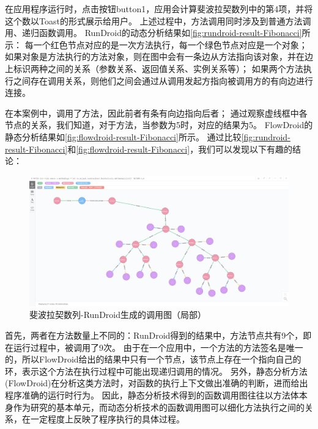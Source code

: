 在应用程序运行时，点击按钮button1，应用会计算斐波拉契数列中的第4项，并将这个数以Toast的形式展示给用户。
上述过程中，方法调用同时涉及到普通方法调用、递归函数调用。
RunDroid的动态分析结果如\autoref{fig:rundroid-result-Fibonacci}所示：
每一个红色节点对应的是一次方法执行，每一个绿色节点对应是一个对象；
如果对象是方法执行的方法对象，则在图中会有一条边从方法指向该对象，并在边上标识两种之间的关系（参数关系、返回值关系、实例关系等）；
如果两个方法执行之间存在调用关系，则他们之间会通过从调用发起方指向被调用方的有向边进行连接。

在本案例中，调用了方法，因此前者有条有向边指向后者；
通过观察虚线框中各节点的关系，我们知道，对于方法，当参数为5时，对应的结果为5。
FlowDroid的静态分析结果如\autoref{fig:flowdroid-result-Fibonacci}所示。
通过比较\autoref{fig:rundroid-result-Fibonacci}和\autoref{fig:flowdroid-result-Fibonacci}，我们可以发现以下有趣的结论：


\begin{figure}[!ht]
	\centering
	\includegraphics[width=\textwidth]{./Figures/doFibonacci-rundroid.png}
	\caption{斐波拉契数列-RunDroid生成的调用图（局部）}
	\label{fig:rundroid-result-Fibonacci}
\end{figure}

首先，两者在方法数量上不同的：RunDroid得到的结果中，方法节点共有9个，即在运行过程中，被调用了9次。
由于在一个应用中，一个方法的方法签名是唯一的，所以FlowDroid给出的结果中只有一个节点，该节点上存在一个指向自己的环，表示这个方法在执行过程中可能出现递归调用的情况。
另外，静态分析方法(FlowDroid)在分析这类方法时，对函数的执行上下文做出准确的判断，进而给出程序准确的运行时行为。
因此，静态分析技术得到的函数调用图往往以方法体本身作为研究的基本单元，而动态分析技术的函数调用图可以细化方法执行之间的关系，在一定程度上反映了程序执行的具体过程。




